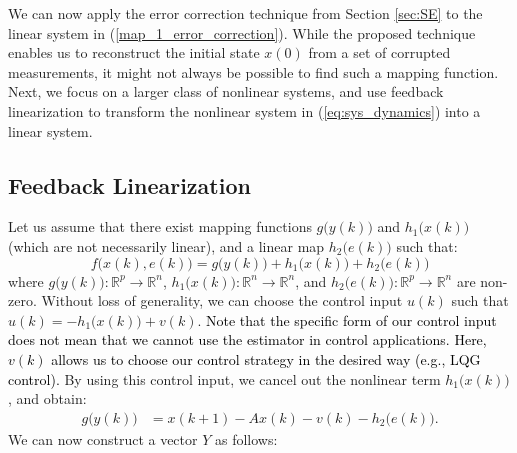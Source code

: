 We can now apply the error correction technique from Section \ref{sec:SE} to the linear system in (\ref{map_1_error_correction}). While the proposed technique enables us to reconstruct the initial state $x(0)$ from a set of corrupted measurements, it might not always be possible to find such a mapping function. Next, we focus on a larger class of nonlinear systems, and use feedback linearization to transform the nonlinear system in (\ref{eq:sys_dynamics}) into a linear system.



\subsection{Feedback Linearization}
Let us assume that there exist mapping functions $g\big(y(k)\big)$ and $h_1\big(x(k)\big)$ (which are not necessarily linear), and a linear map $h_2\big(e(k)\big)$ such that:
\begin{equation}\label{eq:form_feedback}
f\big(x(k),e(k)\big)= g\big(y(k)\big) + h_1\big(x(k)\big) + h_2\big(e(k)\big)	
\end{equation}
where $g\big(y(k)\big): \mathbb{R}^p \rightarrow \mathbb{R}^n$, $h_1\big(x(k)\big): \mathbb{R}^n \rightarrow \mathbb{R}^n$, and $h_2\big(e(k)\big): \mathbb{R}^p \rightarrow \mathbb{R}^n$ are non-zero.
Without loss of generality, we can choose the control input $u(k)$ such that $u(k)=-h_1 \big(x(k) \big)+v(k)$. \noindent \textcolor{black}{Note that the specific form of our control input does not mean that we cannot use the estimator in control applications. Here, $v(k)$ allows us to choose our control strategy in the desired way (e.g., LQG control).} By using this control input, we cancel out the nonlinear term $h_1\big(x(k)\big)$, and obtain:
\begin{equation}
\begin{aligned}
	g\big(y(k)\big) &= x(k+1) - A x(k) - v(k) - h_2\big(e(k)\big).\nonumber
\end{aligned}
\end{equation}
We can now construct a vector $Y$ as follows:
